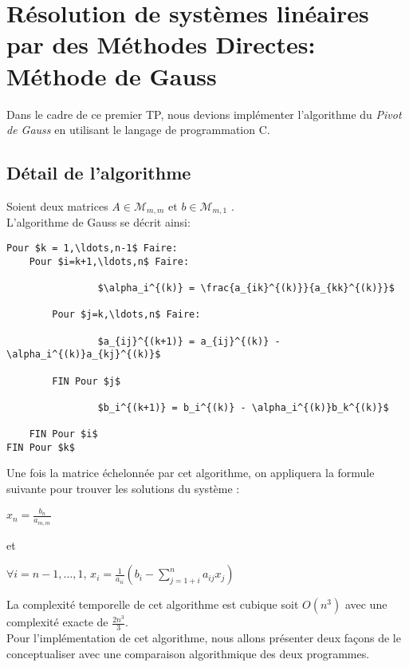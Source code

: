 \chapter{Résolution de systèmes linéaires par des Méthodes Directes: Méthode de Gauss}
Dans le cadre de ce premier TP, nous devions implémenter l'algorithme du \emph{Pivot de Gauss} en utilisant le langage de programmation C.
\section{Détail de l'algorithme}
Soient deux matrices $A \in \mathcal{M}_{m,m} \text{ et  } b \in \mathcal{M}_{m,1}$ . \\
L'algorithme de Gauss se décrit ainsi: \\
\begin{lstlisting}[mathescape=true, frame=single]
Pour $k = 1,\ldots,n-1$ Faire:
	Pour $i=k+1,\ldots,n$ Faire:

				$\alpha_i^{(k)} = \frac{a_{ik}^{(k)}}{a_{kk}^{(k)}}$ 
		
		Pour $j=k,\ldots,n$ Faire:

		   		$a_{ij}^{(k+1)} = a_{ij}^{(k)} - \alpha_i^{(k)}a_{kj}^{(k)}$
	
		FIN Pour $j$

				$b_i^{(k+1)} = b_i^{(k)} - \alpha_i^{(k)}b_k^{(k)}$

	FIN Pour $i$
FIN Pour $k$
\end{lstlisting}
\newpage
Une fois la matrice échelonnée par cet algorithme, on appliquera la formule suivante pour trouver les solutions du système : \\
\begin{mdframed}
\begin{center}
\begin{large}
$ x_n = \frac{b_n}{a_{m,m}}$ \\
\end{large}
\end{center}
et \\
\begin{center}
\begin{large}
$ \forall i = n-1, \ldots, 1$, $x_i = \frac{1}{a_{ii}}\left( b_i-\sum\limits_{j=1+i}^n a_{ij}x_j \right)$\\
\end{large}
\end{center}
\end{mdframed}
La complexité temporelle de cet algorithme est cubique soit $O(n^3)$ avec une complexité exacte de $\frac{2n^3}{3}$. \\
Pour l'implémentation de cet algorithme, nous allons présenter deux façons de le conceptualiser avec une comparaison algorithmique des deux programmes. \\
